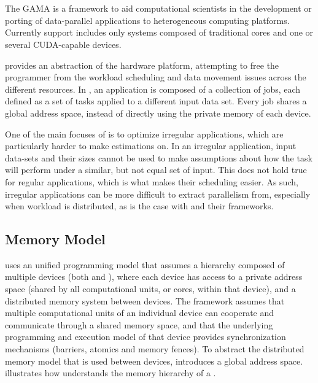\documentclass[main.tex]{subfiles}
\begin{document}
\section{\gama} \label{chapter:gama}



The \acf{GAMA} is a framework to aid computational scientists in the development or porting of data-parallel applications to heterogeneous computing platforms. Currently \hetplat support includes only systems composed of traditional \cpus cores and one or several CUDA-capable \gpu devices.

\gama provides an abstraction of the hardware platform, attempting to free the programmer from the workload scheduling and data movement issues across the different resources. In \gama, an application is composed of a collection of jobs, each defined as a set of tasks applied to a different input data set. Every job shares a global address space, instead of directly using the private memory of each device.

One of the main focuses of \gama is to optimize irregular applications, which are particularly harder to make estimations on. In an irregular application, input data-sets and their sizes cannot be used to make assumptions about how the task will perform under a similar, but not equal set of input. This does not hold true for regular applications, which is what makes their scheduling easier. As such, irregular applications can be more difficult to extract parallelism from, especially when workload is distributed, as is the case with \hetplats and their frameworks.


\subsection{Memory Model}

\gama uses an unified programming model that assumes a hierarchy composed of multiple devices (both \cpus and \gpus), where each device has access to a private address space (shared by all computational units, or cores, within that device), and a distributed memory system between devices. The framework assumes that multiple computational units of an individual device can cooperate and communicate through a shared memory space, and that the underlying programming and execution model of that device provides synchronization mechanisms (barriers, atomics and memory fences).
To abstract the distributed memory model that is used between devices, \gama introduces a global address space.  illustrates how \gama understands the memory hierarchy of a \hetplat.
\end{document}
